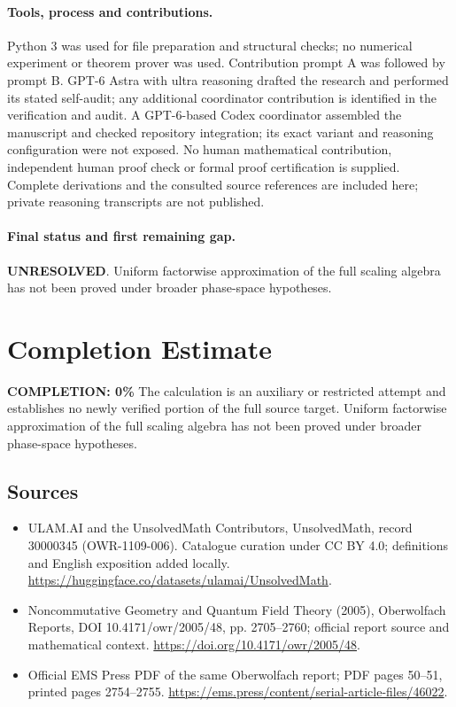 \documentclass[11pt]{article}
\begin{document}
\paragraph{Tools, process and contributions.}
Python 3 was used for file preparation and structural checks; no numerical experiment or theorem prover was used. Contribution prompt A was followed by prompt B. GPT-6 Astra with ultra reasoning drafted the research and performed its stated self-audit; any additional coordinator contribution is identified in the verification and audit. A GPT-6-based Codex coordinator assembled the manuscript and checked repository integration; its exact variant and reasoning configuration were not exposed. No human mathematical contribution, independent human proof check or formal proof certification is supplied. Complete derivations and the consulted source references are included here; private reasoning transcripts are not published.

\paragraph{Final status and first remaining gap.}
\textbf{UNRESOLVED}. Uniform factorwise approximation of the full scaling algebra has not been proved under broader phase-space hypotheses.

\section{Completion Estimate}
\noindent\textbf{COMPLETION: 0\%}
The calculation is an auxiliary or restricted attempt and establishes no newly verified portion of the full source target. Uniform factorwise approximation of the full scaling algebra has not been proved under broader phase-space hypotheses.

\subsection{Sources}
\begin{itemize}
\item[\hypertarget{source:30000345:1}{S1}] ULAM.AI and the UnsolvedMath Contributors, UnsolvedMath, record 30000345 (OWR-1109-006). Catalogue curation under CC BY 4.0; definitions and English exposition added locally.
\url{https://huggingface.co/datasets/ulamai/UnsolvedMath}.
\item[\hypertarget{source:30000345:2}{S2}] Noncommutative Geometry and Quantum Field Theory (2005), Oberwolfach Reports, DOI 10.4171/owr/2005/48, pp. 2705--2760; official report source and mathematical context.
\url{https://doi.org/10.4171/owr/2005/48}.
\item[\hypertarget{source:30000345:3}{S3}] Official EMS Press PDF of the same Oberwolfach report; PDF pages 50--51, printed pages 2754--2755.
\url{https://ems.press/content/serial-article-files/46022}.
\end{itemize}
\label{end:30000345}
\end{document}
